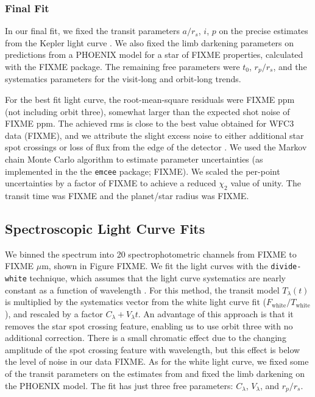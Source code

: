 \documentclass[twocolumn]{aastex61}
\begin{document}
\subsubsection{Final Fit}
In our final fit, we fixed the transit parameters $a/r_s$, $i$, $p$ on the precise estimates from the Kepler light curve \citep{dai17}.  We also fixed the limb darkening parameters on predictions from a PHOENIX model for a star of FIXME properties, calculated with the FIXME package.  The remaining free parameters were $t_0$, $r_p/r_s$, and the systematics parameters for the visit-long and orbit-long trends.

For the best fit light curve, the root-mean-square residuals were FIXME ppm (not including orbit three), somewhat larger than the expected shot noise of FIXME ppm. The achieved rms is close to the best value obtained for WFC3 data (FIXME), and we attribute the slight excess noise to either additional star spot crossings or loss of flux from the edge of the detector \citep[as has been seen for other bright targets;][]{FIXME}. We used the Markov chain Monte Carlo algorithm to estimate parameter uncertainties (as implemented in the the \texttt{emcee} package; FIXME). We scaled the per-point uncertainties by a factor of FIXME to achieve a reduced $\chi_2$ value of unity. The transit time was FIXME and the planet/star radius was FIXME.

\subsection{Spectroscopic Light Curve Fits}
We binned the spectrum into 20 spectrophotometric channels from FIXME to FIXME $\mu$m, shown in Figure FIXME. We fit the light curves with the \texttt{divide-white} technique, which assumes that the light curve systematics are nearly constant as a function of wavelength \citep{stevenson??, kreidberg14a}. For this method, the transit model $T_\lambda(t)$ is multiplied by the systematics vector from the white light curve fit ($F_\mathrm{white}/T_\mathrm{white}$), and rescaled by a factor $C_\lambda + V_\lambda t$.  An advantage of this approach is that it removes the star spot crossing feature, enabling us to use orbit three with no additional correction. There is a small chromatic effect due to the changing amplitude of the spot crossing feature with wavelength, but this effect is below the level of noise in our data FIXME.  As for the white light curve, we fixed some of the transit parameters on the estimates from \cite{dai17} and fixed the limb darkening on the PHOENIX model. The fit has just three free parameters: $C_\lambda$, $V_\lambda$, and $r_p/r_s$.  
\end{document}
